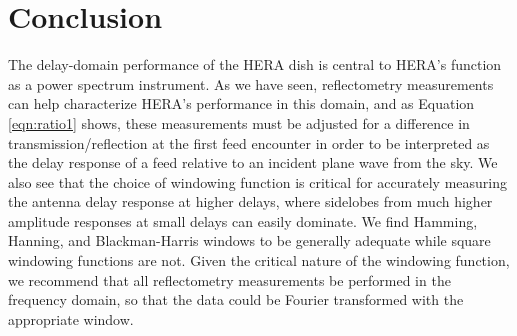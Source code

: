 \documentclass[twocolumn]{emulateapj}
\begin{document}




\section{\textbf{Conclusion}}

The delay-domain performance of the HERA dish is central to HERA's function as a power spectrum instrument.
As we have seen, reflectometry measurements can help characterize HERA's performance in this domain, and
as Equation \ref{eqn:ratio1} shows, these measurements must be adjusted for a difference in transmission/reflection
at the first feed encounter in order to be interpreted as the delay response of a feed relative to an incident
plane wave from the sky.  We also see that the choice of windowing function is critical for accurately measuring the
antenna delay response at higher delays, where sidelobes from much higher amplitude responses at small delays can easily
dominate.  We find Hamming, Hanning, and Blackman-Harris windows to be generally adequate while square windowing functions are not.
Given the critical nature of the windowing function, we recommend that all reflectometry measurements be performed in the
frequency domain, so that the data could be Fourier transformed with the appropriate window.
\end{document}
